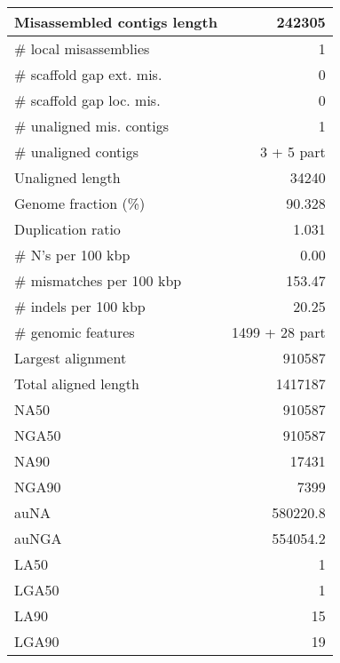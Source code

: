 \documentclass[12pt,a4paper]{article}
\begin{document}
\begin{table}[ht]
\begin{center}
\begin{tabular}{|l*{1}{|r}|}
Misassembled contigs length & 242305 \\ \hline
\# local misassemblies & 1 \\ \hline
\# scaffold gap ext. mis. & 0 \\ \hline
\# scaffold gap loc. mis. & 0 \\ \hline
\# unaligned mis. contigs & 1 \\ \hline
\# unaligned contigs & 3 + 5 part \\ \hline
Unaligned length & 34240 \\ \hline
Genome fraction (\%) & 90.328 \\ \hline
Duplication ratio & 1.031 \\ \hline
\# N's per 100 kbp & 0.00 \\ \hline
\# mismatches per 100 kbp & 153.47 \\ \hline
\# indels per 100 kbp & 20.25 \\ \hline
\# genomic features & 1499 + 28 part \\ \hline
Largest alignment & 910587 \\ \hline
Total aligned length & 1417187 \\ \hline
NA50 & 910587 \\ \hline
NGA50 & 910587 \\ \hline
NA90 & 17431 \\ \hline
NGA90 & 7399 \\ \hline
auNA & 580220.8 \\ \hline
auNGA & 554054.2 \\ \hline
LA50 & 1 \\ \hline
LGA50 & 1 \\ \hline
LA90 & 15 \\ \hline
LGA90 & 19 \\ \hline
\end{tabular}
\end{center}
\end{table}
\end{document}
